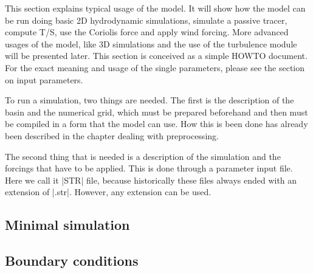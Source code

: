 \documentclass{report}
\newcommand{\todo}[1]{This section still has to be written by #1}
\begin{document}
This section explains typical usage of the model. It will show how
the model can be run doing basic 2D hydrodynamic simulations, simulate
a passive tracer, compute T/S, use the Coriolis force and apply wind
forcing. More advanced usages of the model, like 3D simulations and the
use of the turbulence module will be presented later. This section is
conceived as a simple HOWTO document. For the exact meaning and usage
of the single parameters, please see the section on input parameters.

To run a simulation, two things are needed. The first is the description
of the basin and the numerical grid, which must be prepared beforehand and
then must be compiled in a form that the model can use. How this is been
done has already been described in the chapter dealing with preprocessing.

The second thing that is needed is a description of the simulation and the
forcings that have to be applied. This is done through a parameter input
file. Here we call it |STR| file, because historically these files always
ended with an extension of |.str|. However, any extension can be used.

	\subsection{Minimal simulation}
	

	\subsection{Boundary conditions}
	




\end{document}
